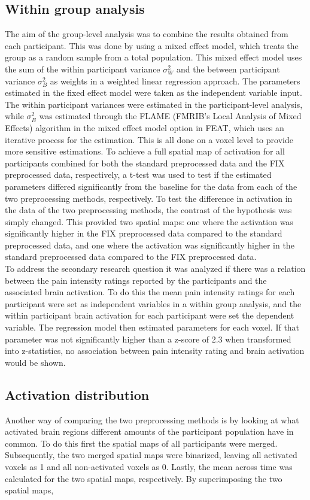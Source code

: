 \subsection{Within group analysis}
The aim of the group-level analysis was to combine the results obtained from each participant. This was done by using a mixed effect model, which treats the group as a random sample from a total population. This mixed effect model uses the sum of the within participant variance $\sigma_{W}^{2}$ and the between participant variance $\sigma_{B}^{2}$ as weights in a weighted linear regression approach. The parameters estimated in the fixed effect model were taken as the independent variable input. The within participant variances were estimated in the participant-level analysis, while $\sigma_{B}^{2}$ was estimated through the FLAME (FMRIB's Local Analysis of Mixed Effects) algorithm in the mixed effect model option in FEAT, which uses an iterative process for the estimation. This is all done on a voxel level to provide more sensitive estimations.
To achieve a full spatial map of activation for all participants combined for both the standard preprocessed data and the FIX preprocessed data, respectively, a t-test was used to test if the estimated parameters differed significantly from the baseline for the data from each of the two preprocessing methods, respectively. 
To test the difference in activation in the data of the two preprocessing methods, the contrast of the hypothesis was simply changed. This provided two spatial maps: one where the activation was significantly higher in the FIX preprocessed data compared to the standard preprocessed data, and one where the activation was significantly higher in the standard preprocessed data compared to the FIX preprocessed data. \\
To address the secondary research question it was analyzed if there was a relation between the pain intensity ratings reported by the participants and the associated brain activation. To do this the mean pain intensity ratings for each participant were set as independent variables in a within group analysis, and the within participant brain activation for each participant were set the dependent variable. The regression model then estimated parameters for each voxel. If that parameter was not significantly higher than a z-score of 2.3 when transformed into z-statistics, no association between pain intensity rating and brain activation would be shown. 

\subsection{Activation distribution}
Another way of comparing the two preprocessing methods is by looking at what activated brain regions different amounts of the participant population have in common. To do this first the spatial maps of all participants were merged. Subsequently, the two merged spatial maps were binarized, leaving all activated voxels as 1 and all non-activated voxels as 0. Lastly, the mean across time was calculated for the two spatial maps, respectively. 
By superimposing the two spatial maps,
